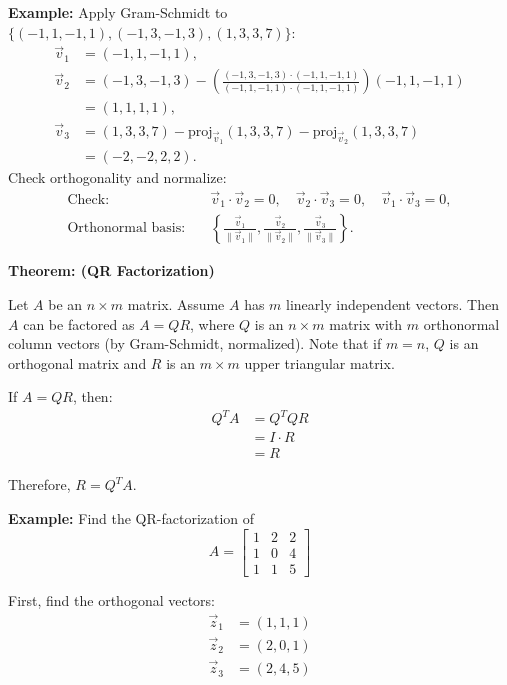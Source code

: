 \documentclass{article}
\begin{document}
\textbf{Example:} Apply Gram-Schmidt to $\{(-1, 1, -1, 1), (-1, 3, -1, 3), (1, 3, 3, 7)\}$:
\[
\begin{aligned}
\vec{v}_1 &= (-1, 1, -1, 1), \\
\vec{v}_2 &= (-1, 3, -1, 3) - \left(\frac{(-1, 3, -1, 3) \cdot (-1, 1, -1, 1)}{(-1, 1, -1, 1) \cdot (-1, 1, -1, 1)}\right)(-1, 1, -1, 1) \\
&= (1, 1, 1, 1), \\
\vec{v}_3 &= (1, 3, 3, 7) - \text{proj}_{\vec{v}_1}(1, 3, 3, 7) - \text{proj}_{\vec{v}_2}(1, 3, 3, 7) \\
&= (-2, -2, 2, 2).
\end{aligned}
\]
Check orthogonality and normalize:
\[
\begin{aligned}
\text{Check:} &\quad \vec{v}_1 \cdot \vec{v}_2 = 0, \quad \vec{v}_2 \cdot \vec{v}_3 = 0, \quad \vec{v}_1 \cdot \vec{v}_3 = 0, \\
\text{Orthonormal basis:} &\quad \left\{\frac{\vec{v}_1}{\|\vec{v}_1\|}, \frac{\vec{v}_2}{\|\vec{v}_2\|}, \frac{\vec{v}_3}{\|\vec{v}_3\|}\right\}.
\end{aligned}
\]

\textbf{Theorem: (QR Factorization)}

Let \( A \) be an \( n \times m \) matrix. Assume \( A \) has \( m \) linearly independent vectors. Then \( A \) can be factored as \( A = QR \), where \( Q \) is an \( n \times m \) matrix with \( m \) orthonormal column vectors (by Gram-Schmidt, normalized). Note that if \( m = n \), \( Q \) is an orthogonal matrix and \( R \) is an \( m \times m \) upper triangular matrix.

If \( A = QR \), then:
\[
\begin{aligned}
Q^T A &= Q^T QR \\
&= I \cdot R \\
&= R
\end{aligned}
\]

Therefore, \( R = Q^T A \).


\textbf{Example:} Find the QR-factorization of
\[
A = \begin{bmatrix} 
1 & 2 & 2 \\
1 & 0 & 4 \\
1 & 1 & 5 
\end{bmatrix}
\]

First, find the orthogonal vectors:
\[
\begin{aligned}
\vec{z}_1 &= (1,1,1) \\
\vec{z}_2 &= (2,0,1) \\
\vec{z}_3 &= (2,4,5)
\end{aligned}
\]
\end{document}
